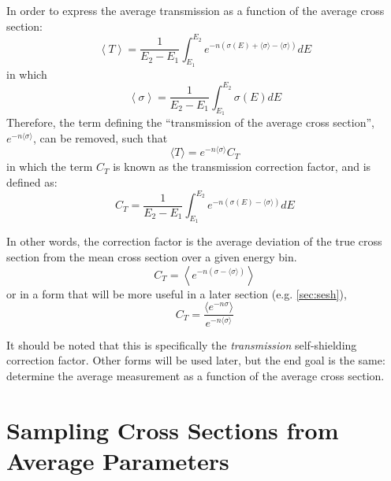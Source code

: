 In order to express the average transmission as a function of the average cross section:
\begin{equation}
    \label{eq:transmission-of-average}
    \left\langle T \right\rangle = \frac{1}{E_2 - E_1} \int_{E_1}^{E_2} e^{-n \left( \sigma(E) + \langle \sigma \rangle - \langle \sigma \rangle \right)}dE
\end{equation}
in which 
\begin{equation}
    \label{eq:energy-average-cross-section}
    \left\langle \sigma \right\rangle = \frac{1}{E_2 - E_1} \int_{E_1}^{E_2} \sigma(E) dE
\end{equation}
Therefore, the term defining the ``transmission of the average cross section'', $e^{-n \langle \sigma \rangle}$, can be removed, such that 
\begin{equation}
    \label{eq:corrected-average-transmission}
    \langle T \rangle = e^{-n \langle \sigma \rangle} C_T
\end{equation}
in which the term $C_T$ is known as the transmission correction factor, and is defined as:
\begin{equation}
    \label{eq:transmission-correction-factor}
    C_T = \frac{1}{E_2 - E_1} \int_{E_1}^{E_2} e^{-n \left( \sigma(E) - \langle \sigma \rangle \right)}dE
\end{equation}

In other words, the correction factor is the average deviation of the true cross section from the mean cross section over a given energy bin.
\begin{equation}
    \label{eq:ct-elegant-form}
    C_T = \left\langle e^{-n (\sigma - \langle \sigma \rangle)} \right\rangle
\end{equation}
or in a form that will be more useful in a later section (e.g. \autoref{sec:sesh}),
\begin{equation}
    \label{eq:ct-sesh-form}
    C_T = \frac{\langle e^{-n \sigma} \rangle}{ e^{-n \langle \sigma \rangle}}
\end{equation}


It should be noted that this is specifically the \textit{transmission} self-shielding correction factor. Other forms will be used later, but the end goal is the same: determine the average measurement as a function of the average cross section.

\section{Sampling Cross Sections from Average Parameters}
\label{sec:mc-sampling-from-average-parameters}

